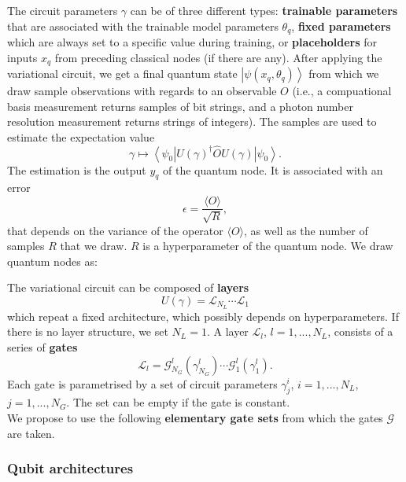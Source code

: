 \documentclass[aps,pra,10pt,twocolumn,groupedaddress,nofootinbib]{revtex4-1}
\theoremstyle{plain}
\newcommand{\ket}[1]{\ensuremath{\left| #1 \right \rangle}}
\newcommand{\bra}[1]{\ensuremath{\left \langle #1 \right |}}
\renewcommand{\L}{\mathcal{L}}
\newcommand{\G}{\mathcal{G}}
\begin{document}
The circuit parameters $\gamma$ can be of three different types: \textbf{trainable parameters} that are associated with the trainable model parameters  $\theta_q$, \textbf{fixed parameters} which are always set to a specific value during training, or \textbf{placeholders} for inputs $x_q$ from preceding classical nodes (if there are any). After applying the variational circuit, we get a final quantum state $\ket{\psi (x_q, \theta_q) }$ from which we draw sample observations with regards to an observable $O$ (i.e., a compuational basis measurement returns samples of bit strings, and a photon number resolution measurement returns strings of integers). The samples are used to estimate the expectation value
\[\gamma \mapsto \bra{\psi_0} U(\gamma)^{\dagger}  \hat{O} U(\gamma) \ket{\psi_0}.\]
The estimation is the output $y_q$ of the quantum node. It is associated with an error
\[ \epsilon = \frac{\langle O \rangle}{\sqrt{R}}, \]
that depends on the variance of the operator $\langle O \rangle$, as well as the number of samples $R$ that we draw. $R$ is a hyperparameter of the quantum node. We draw quantum nodes as:\\
\begin{figure}[h]
\centering
{}
\end{figure}


The variational circuit can be composed of \textbf{layers}
\[ U (\gamma) = \L_{N_L} \cdots \L_{1}\]
which repeat a fixed architecture, which possibly depends on hyperparameters. If there is no layer structure, we set $N_L=1$. A layer $\L_l$, $l=1,...,N_L$, consists of a series of \textbf{gates}
\[\L_l = \G^l_{N_G}(\gamma^l_{N_G}) \cdots \G^l_1(\gamma^l_1). \]
Each gate is parametrised by a set of circuit parameters
$\gamma^i_j$, $i = 1,...,N_L$, $j=1,...,N_G$. The set can be empty if the gate is constant.\\

We propose to use the following \textbf{elementary gate sets} from which the gates $\mathcal{G}$ are taken.

\subsubsection{Qubit architectures}
\end{document}
